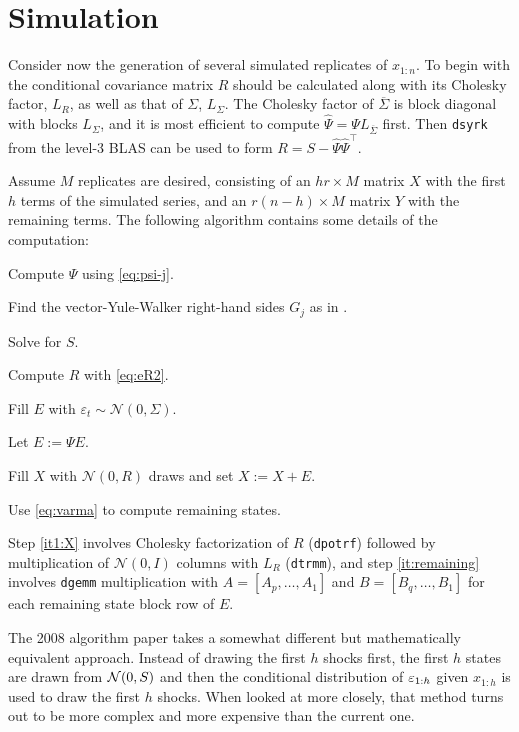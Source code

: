 \documentclass[a4paper,12pt]{extarticle} %
\begin{document}
\section{Simulation}
Consider now the generation of several simulated replicates of $x_{1:n}$. To
begin with the conditional covariance matrix $R$ should be calculated along with
its Cholesky factor, $L_R$, as well as that of $\Sigma$, $L_\Sigma$. The
Cholesky factor of $\overline{\Sigma}$ is block diagonal with blocks $L_\Sigma$,
and it is most efficient to compute $\hat{\Psi} = \Psi L_{\overline{\Sigma}}$
first. Then \texttt{dsyrk} from the level-3 BLAS can be used to form $R =
S - \hat{\Psi} \hat{\Psi}^\top$.

Assume $M$ replicates are desired, consisting of an $hr \times M$ matrix $X$
with the first $h$ terms of the simulated series, and an $r(n-h) \times M$ matrix
$Y$ with the remaining terms. The following algorithm contains some details of
the computation:
%
\begin{algorithm}[H]
  \caption*{VARMA simulation}
  \begin{algorithmic}[1]
    \item Compute $\Psi$ using \eqref{eq:psi-j}.
    \item Find the vector-Yule-Walker right-hand sides $G_j$ as in
      \citet[Appendix B]{jonasson2006efficient}.
    \item Solve for $S$.
    \item Compute $R$ with \eqref{eq:eR2}.
    \item Fill $E$ with $\varepsilon_t \!\sim\! \mathcal N(0,\Sigma)$.
    \item Let $E := \Psi E$.
    \item Fill $X$ with $\mathcal N(0,R)$ draws and set $X := X + E$.\label{it1:X}
    \item Use \eqref{eq:varma} to compute remaining states.\label{it:remaining}
  \end{algorithmic}
\end{algorithm}
\vspace{-\baselineskip}
%
Step \ref{it1:X} involves Cholesky factorization of $R$ (\texttt{dpotrf})
followed by multiplication of $\mathcal N(0,I)$ columns with $L_R$
(\texttt{dtrmm}), and step \ref{it:remaining} involves \texttt{dgemm}
multiplication with $A=[A_p,\ldots,A_1]$ and $B=[B_q,\ldots,B_1]$ for each
remaining state block row of $E$.

The 2008 algorithm paper takes a somewhat different but mathematically
equivalent approach. Instead of drawing the first $h$ shocks first, the first
$h$ states are drawn from $\mathcal{N}(0, S)$ and then the conditional distribution of
$\varepsilon_{1:h}$ given $x_{1:h}$ is used to draw the first $h$ shocks. When looked
at more closely, that method turns out to be more complex and more expensive
than the current one.
\end{document}
